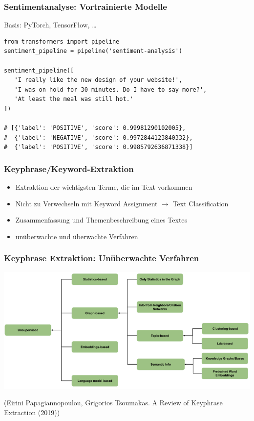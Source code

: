 
\begin{frame}[fragile]
\frametitle{Sentimentanalyse: Vortrainierte Modelle}

Basis: PyTorch, TensorFlow, \dots

\begin{verbatim}
from transformers import pipeline
sentiment_pipeline = pipeline('sentiment-analysis')

sentiment_pipeline([
   'I really like the new design of your website!',
   'I was on hold for 30 minutes. Do I have to say more?',
   'At least the meal was still hot.'
])

# [{'label': 'POSITIVE', 'score': 0.99981290102005},
#  {'label': 'NEGATIVE', 'score': 0.9972844123840332},
#  {'label': 'POSITIVE', 'score': 0.9985792636871338}]
\end{verbatim}
\end{frame}


\begin{frame}
\frametitle{Keyphrase/Keyword-Extraktion}


\begin{itemize}
    \item Extraktion der wichtigsten Terme, die im Text vorkommen
    \item Nicht zu Verwechseln mit Keyword Assignment $\rightarrow$ Text Classification
    \item Zusammenfassung und Themenbeschreibung eines Textes
    \item unüberwachte und überwachte Verfahren
    \end{itemize}
    
\end{frame}
    
 
\begin{frame}
    \frametitle{Keyphrase Extraktion: Unüberwachte Verfahren}

    \centering\includegraphics[width=0.95\linewidth]{fig8/kpe_unsupervised}
    
    {\tiny (Eirini Papagiannopoulou, Grigorios Tsoumakas. A Review of Keyphrase Extraction (2019))}

  
\end{frame}
    
